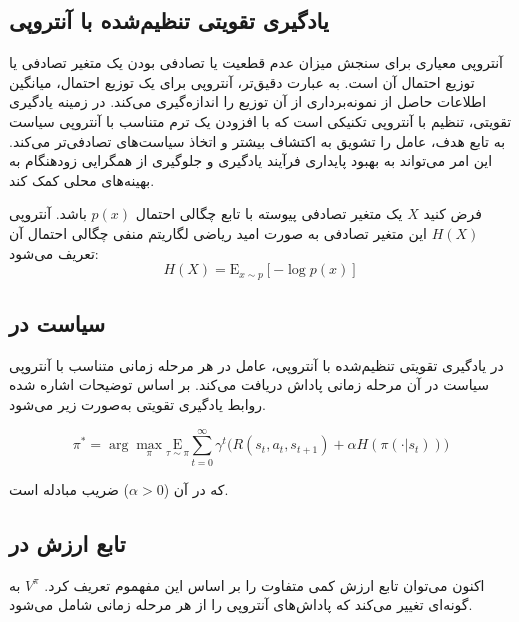   
  
  
   
      \subsection{یادگیری تقویتی تنظیم‌شده با آنتروپی}
      آنتروپی معیاری برای سنجش میزان عدم قطعیت یا تصادفی بودن یک متغیر تصادفی یا توزیع احتمال آن است. به عبارت دقیق‌تر، آنتروپی برای یک توزیع احتمال، میانگین اطلاعات حاصل از نمونه‌برداری از آن توزیع را اندازه‌گیری می‌کند. در زمینه یادگیری تقویتی، تنظیم با آنتروپی تکنیکی است که با افزودن یک ترم متناسب با آنتروپی سیاست به تابع هدف، عامل را تشویق به اکتشاف بیشتر و اتخاذ سیاست‌های تصادفی‌تر می‌کند. این امر می‌تواند به بهبود پایداری فرآیند یادگیری و جلوگیری از همگرایی زودهنگام به بهینه‌های محلی کمک کند.
      
      فرض کنید \(X\) یک متغیر تصادفی پیوسته با تابع چگالی احتمال \(p(x)\) باشد. آنتروپی \(H(X)\) این متغیر تصادفی به صورت امید ریاضی لگاریتم منفی چگالی احتمال آن تعریف می‌شود:
\begin{equation}
	H(X) = \mathrm E_{x \sim p} \left[ -\log p(x) \right]
\end{equation}
   
      
       \subsection{سیاست در }
       در یادگیری تقویتی تنظیم‌شده با آنتروپی، عامل در هر مرحله زمانی متناسب با آنتروپی سیاست در آن مرحله زمانی پاداش دریافت می‌کند. بر اساس توضیحات اشاره شده روابط یادگیری تقویتی به‌صورت زیر می‌شود.
       
       \begin{equation}
        \pi^* = \arg \max_{\pi} \underset{\tau \sim \pi}{\mathrm E}{ \sum_{t=0}^{\infty} \gamma^t \bigg( R(s_t, a_t, s_{t+1}) + \alpha H\left(\pi(\cdot|s_t)\right) \bigg)}
       \end{equation}
       
       
       
       که در آن
        (\(\alpha > 0\))
         ضریب مبادله
          است.
          \subsection{تابع ارزش در }
           اکنون می‌توان تابع ارزش کمی متفاوت را بر اساس این مفهموم تعریف کرد.
            \(V^{\pi}\)
             به گونه‌ای تغییر می‌کند که پاداش‌های آنتروپی را از هر مرحله زمانی شامل می‌شود.
             
